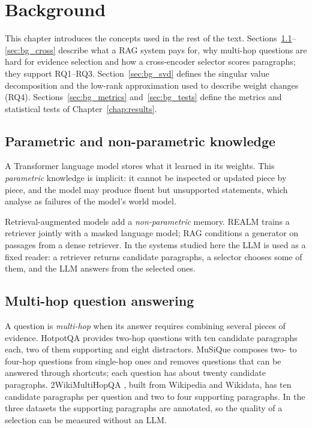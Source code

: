 \chapter{Background}
\label{chap:background}

This chapter introduces the concepts used in the rest of the text. Sections~\ref{sec:bg_rag}--\ref{sec:bg_cross} describe what a RAG system pays for, why multi-hop questions are hard for evidence selection and how a cross-encoder selector scores paragraphs; they support RQ1--RQ3. Section~\ref{sec:bg_svd} defines the singular value decomposition and the low-rank approximation used to describe weight changes (RQ4). Sections~\ref{sec:bg_metrics} and~\ref{sec:bg_tests} define the metrics and statistical tests of Chapter~\ref{chap:results}.

\section{Parametric and non-parametric knowledge}
\label{sec:bg_rag}

A Transformer language model \cite{vaswani2017attention} stores what it learned in its weights. This \emph{parametric} knowledge is implicit: it cannot be inspected or updated piece by piece, and the model may produce fluent but unsupported statements, which  analyse as failures of the model's world model.

Retrieval-augmented models add a \emph{non-parametric} memory. REALM \cite{pmlr-v119-guu20a} trains a retriever jointly with a masked language model; RAG \cite{3495724.3496517} conditions a generator on passages from a dense retriever. In the systems studied here the LLM is used as a fixed reader: a retriever returns candidate paragraphs, a selector chooses some of them, and the LLM answers from the selected ones.

\section{Multi-hop question answering}
\label{sec:bg_multihop}

A question is \emph{multi-hop} when its answer requires combining several pieces of evidence. HotpotQA \cite{yang2018hotpotqa} provides two-hop questions with ten candidate paragraphs each, two of them supporting and eight distractors. MuSiQue \cite{trivedi2022musique} composes two- to four-hop questions from single-hop ones and removes questions that can be answered through shortcuts; each question has about twenty candidate paragraphs. 2WikiMultiHopQA \cite{ho2020twowiki}, built from Wikipedia and Wikidata, has ten candidate paragraphs per question and two to four supporting paragraphs. In the three datasets the supporting paragraphs are annotated, so the quality of a selection can be measured without an LLM.


